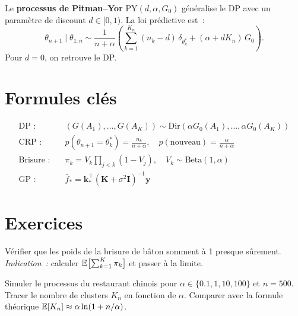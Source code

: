 \begin{definition}
Le \textbf{processus de Pitman--Yor} $\mathrm{PY}(d, \alpha, G_0)$ g\'en\'eralise
le DP avec un param\`etre de discount $d \in [0,1)$. La loi pr\'edictive est~:
\[
  \theta_{n+1} \mid \theta_{1:n} \sim
  \frac{1}{n + \alpha}\left(\sum_{k=1}^{K_n}(n_k - d)\,\delta_{\theta_k^*}
  + (\alpha + d K_n)\,G_0\right).
\]
Pour $d = 0$, on retrouve le DP.
\end{definition}

\section{Formules cl\'es}

\begin{formules}
\begin{align}
  \text{DP :} \quad & (G(A_1), \ldots, G(A_K)) \sim \mathrm{Dir}(\alpha G_0(A_1), \ldots, \alpha G_0(A_K)) \\
  \text{CRP :} \quad & p(\theta_{n+1} = \theta_k^*) = \frac{n_k}{n + \alpha}, \quad
                        p(\text{nouveau}) = \frac{\alpha}{n + \alpha} \\
  \text{Brisure :} \quad & \pi_k = V_k \prod_{j<k}(1-V_j), \quad V_k \sim \mathrm{Beta}(1,\alpha) \\
  \text{GP :} \quad & \bar{f}_* = \mathbf{k}_*^\top(\mathbf{K}+\sigma^2\mathbf{I})^{-1}\mathbf{y}
\end{align}
\end{formules}

\section{Exercices}

\begin{exercice}
V\'erifier que les poids de la brisure de b\^aton somment \`a 1 presque
s\^urement. \emph{Indication~:} calculer $\mathbb{E}\bigl[\sum_{k=1}^K \pi_k\bigr]$ et
passer \`a la limite.
\end{exercice}

\begin{exercice}
Simuler le processus du restaurant chinois pour $\alpha \in \{0.1, 1, 10, 100\}$
et $n = 500$. Tracer le nombre de clusters $K_n$ en fonction de $\alpha$.
Comparer avec la formule th\'eorique $\mathbb{E}[K_n] \approx \alpha \ln(1 + n/\alpha)$.
\end{exercice}

